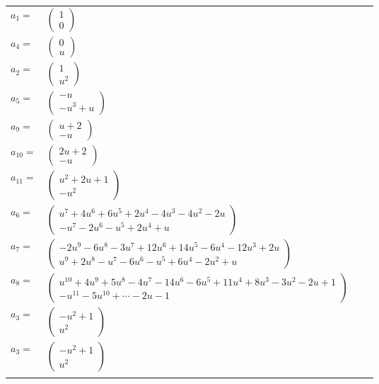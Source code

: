 \documentclass[1p]{elsarticle_modified}
\theoremstyle{definition}
\begin{document}
\begin{tabular}{m{7pt} m{180pt} m{7pt} m{180pt} }
\flushright $a_{1}=$&$\begin{pmatrix}1\\0\end{pmatrix}$ \\
\flushright $a_{4}=$&$\begin{pmatrix}0\\u\end{pmatrix}$ \\
\flushright $a_{2}=$&$\begin{pmatrix}1\\u^2\end{pmatrix}$ \\
\flushright $a_{5}=$&$\begin{pmatrix}- u\\- u^3+u\end{pmatrix}$ \\
\flushright $a_{9}=$&$\begin{pmatrix}u+2\\- u\end{pmatrix}$ \\
\flushright $a_{10}=$&$\begin{pmatrix}2 u+2\\- u\end{pmatrix}$ \\
\flushright $a_{11}=$&$\begin{pmatrix}u^2+2 u+1\\- u^2\end{pmatrix}$ \\
\flushright $a_{6}=$&$\begin{pmatrix}u^7+4 u^6+6 u^5+2 u^4-4 u^3-4 u^2-2 u\\- u^7-2 u^6- u^5+2 u^4+u\end{pmatrix}$ \\
\flushright $a_{7}=$&$\begin{pmatrix}-2 u^9-6 u^8-3 u^7+12 u^6+14 u^5-6 u^4-12 u^3+2 u\\u^9+2 u^8- u^7-6 u^6- u^5+6 u^4-2 u^2+u\end{pmatrix}$ \\
\flushright $a_{8}=$&$\begin{pmatrix}u^{10}+4 u^9+5 u^8-4 u^7-14 u^6-6 u^5+11 u^4+8 u^3-3 u^2-2 u+1\\- u^{11}-5 u^{10}+\cdots-2 u-1\end{pmatrix}$ \\
\flushright $a_{3}=$&$\begin{pmatrix}- u^2+1\\u^2\end{pmatrix}$\\ \flushright $a_{3}=$&$\begin{pmatrix}- u^2+1\\u^2\end{pmatrix}$\\&\end{tabular}
\end{document}
